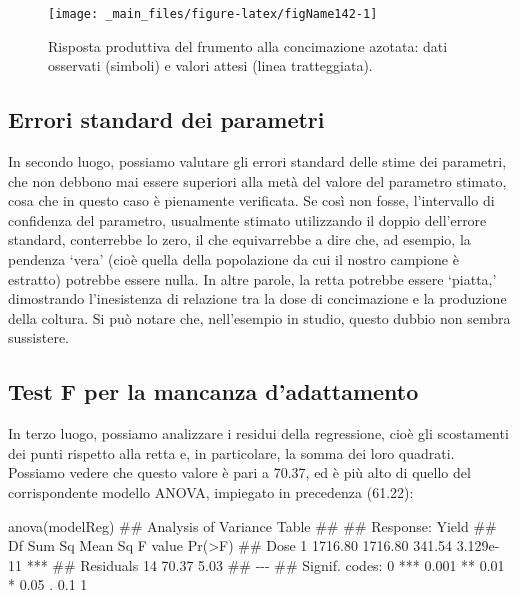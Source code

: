 \documentclass[a4paper,12pt,oneside]{book}
\newenvironment{Shaded}{\begin{snugshade}}{\end{snugshade}}
\newcommand{\DocumentationTok}[1]{#1}
\newcommand{\FunctionTok}[1]{#1}
\newcommand{\NormalTok}[1]{#1}
\begin{document}
\begin{figure}

{\centering \texttt{[image: \_main\_files/figure-latex/figName142-1]} 

}

\caption{Risposta produttiva del frumento alla concimazione azotata: dati osservati (simboli) e valori attesi (linea tratteggiata).}\label{fig:figName142}
\end{figure}

\hypertarget{errori-standard-dei-parametri}{%
\subsection{Errori standard dei parametri}\label{errori-standard-dei-parametri}}

In secondo luogo, possiamo valutare gli errori standard delle stime dei parametri, che non debbono mai essere superiori alla metà del valore del parametro stimato, cosa che in questo caso è pienamente verificata. Se così non fosse, l'intervallo di confidenza del parametro, usualmente stimato utilizzando il doppio dell'errore standard, conterrebbe lo zero, il che equivarrebbe a dire che, ad esempio, la pendenza `vera' (cioè quella della popolazione da cui il nostro campione è estratto) potrebbe essere nulla. In altre parole, la retta potrebbe essere `piatta,' dimostrando l'inesistenza di relazione tra la dose di concimazione e la produzione della coltura. Si può notare che, nell'esempio in studio, questo dubbio non sembra sussistere.

\hypertarget{test-f-per-la-mancanza-dadattamento}{%
\subsection{Test F per la mancanza d'adattamento}\label{test-f-per-la-mancanza-dadattamento}}

In terzo luogo, possiamo analizzare i residui della regressione, cioè gli scostamenti dei punti rispetto alla retta e, in particolare, la somma dei loro quadrati. Possiamo vedere che questo valore è pari a 70.37, ed è più alto di quello del corrispondente modello ANOVA, impiegato in precedenza (61.22):

\begin{Shaded}
\begin{Highlighting}[]
\FunctionTok{anova}\NormalTok{(modelReg)}
\DocumentationTok{\#\# Analysis of Variance Table}
\DocumentationTok{\#\# }
\DocumentationTok{\#\# Response: Yield}
\DocumentationTok{\#\#           Df  Sum Sq Mean Sq F value    Pr(\textgreater{}F)    }
\DocumentationTok{\#\# Dose       1 1716.80 1716.80  341.54 3.129e{-}11 ***}
\DocumentationTok{\#\# Residuals 14   70.37    5.03                      }
\DocumentationTok{\#\# {-}{-}{-}}
\DocumentationTok{\#\# Signif. codes:  0 \textquotesingle{}***\textquotesingle{} 0.001 \textquotesingle{}**\textquotesingle{} 0.01 \textquotesingle{}*\textquotesingle{} 0.05 \textquotesingle{}.\textquotesingle{} 0.1 \textquotesingle{} \textquotesingle{} 1}
\end{Highlighting}
\end{Shaded}
\end{document}
